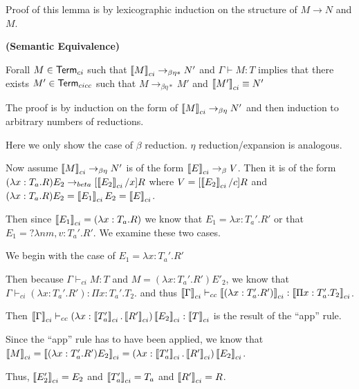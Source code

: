 Proof of this lemma is by lexicographic induction on the structure of $M \rightarrow N$ and $M$.

\begin{theorem}
\textbf{(Semantic Equivalence)}

Forall $M \in \mathsf{Term}_{ci}$ such that $\left\llbracket M \right\rrbracket_{ci} \rightarrow_{\beta\eta*} N'$ and 
$\Gamma \vdash M : T$ implies that there exists $M' \in \mathsf{Term}_{cicc}$ such that 
$M \rightarrow_{\beta\eta*} M'$ and $\left\llbracket M' \right\rrbracket_{ci} \equiv N'$

\label{cicc:equiv}
\end{theorem}

The proof is by induction on the form of $\left\llbracket M \right\rrbracket_{ci} \rightarrow_{\beta\eta} N'$
and then induction to arbitrary numbers of reductions.  

Here we only show the case of $\beta$ reduction.  $\eta$ reduction/expansion is analogous.

Now assume $\left\llbracket M \right\rrbracket_{ci} \rightarrow_{\beta\eta} N'$ is of the form 
$\left\llbracket E \right\rrbracket_{ci} \rightarrow_{\beta} V$.  
Then it is of the form $(\lambda x : T_a . R) E_2 \rightarrow_{beta} [ \left\llbracket E_2 \right\rrbracket_{ci}/ x ] R $
where $V = [ \left\llbracket E_2 \right\rrbracket_{ci} / c ] R$ and $(\lambda x : T_a . R) E_2 = \left\llbracket E_1 \right\rrbracket_{ci} E_2 = \left\llbracket E \right\rrbracket_{ci}$.

Then since $\left\llbracket E_1 \right\rrbracket_{ci} = (\lambda x : T_a . R)$ we know that $E_1 = \lambda x : T_a' . R'$ 
or that $E_1 = ?\lambda nm,v : T_a' . R'$.  We examine these two cases.

\setcounter{tcases}{0}

\begin{tcases}
We begin with the case of $E_1 = \lambda x : T_a' . R'$
\end{tcases}

Then because $\Gamma \vdash_{ci} M : T$ and $M = (\lambda x : T_a' . R') E'_2$, 
we know that $\Gamma \vdash_{ci} (\lambda x : T_a' . R') : \Pi x : T_a' . T_2$.
and thus 
$\left\llbracket \Gamma \right\rrbracket_{ci} \vdash_{cc} 
\left\llbracket (\lambda x : T_a' . R') \right\rrbracket_{ci} : \left\llbracket \Pi x : T_a' . T_2 \right\rrbracket_{ci}$.

Then $\left\llbracket \Gamma \right\rrbracket_{ci} \vdash_{cc} (\lambda x : \left\llbracket T_a' \right\rrbracket_{ci} . \left\llbracket R' \right\rrbracket_{ci}) \left\llbracket E_2 \right\rrbracket_{ci} : \left\llbracket T \right\rrbracket_{ci}$ is the result of the ``app'' rule.  

Since the ``app'' rule has to have been applied, we know that 
$\left\llbracket M \right\rrbracket_{ci} = 
\left\llbracket (\lambda x : T_a' . R') E_2 \right\rrbracket_{ci} 
= (\lambda x : \left\llbracket T_a' \right\rrbracket_{ci} . \left\llbracket R' \right\rrbracket_{ci}) \left\llbracket E_2 \right\rrbracket_{ci}$.

Thus, $\left\llbracket E_2' \right\rrbracket_{ci} = E_2$ and $\left\llbracket T_a' \right\rrbracket_{ci} = T_a$ and $\left\llbracket R' \right\rrbracket_{ci} = R$. 


